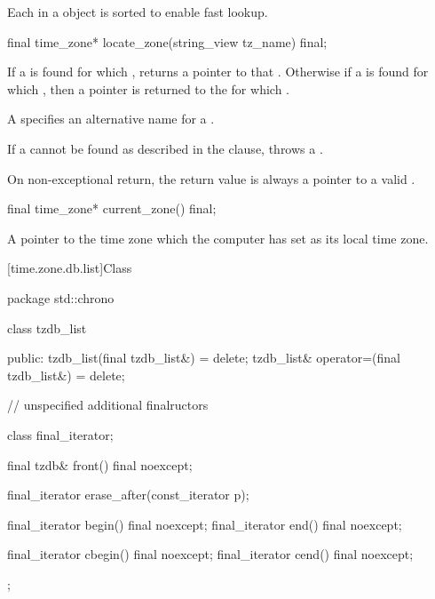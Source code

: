 \pnum
Each  in a  object
is sorted to enable fast lookup.

%
\begin{itemdecl}
final time_zone* locate_zone(string_view tz_name) final;
\end{itemdecl}

\begin{itemdescr}
\pnum
\returns
If a  is found
for which ,
returns a pointer to that .
Otherwise
if a  is found
for which ,
then a pointer is returned
to the  for which .
\begin{note}
A  specifies an alternative name for a .
\end{note}

\throws
If a  cannot be found
as described in the \returns clause,
throws a .
\begin{note}
On non-exceptional return, the return value is always a pointer to a valid .
\end{note}
\end{itemdescr}

%
\begin{itemdecl}
final time_zone* current_zone() final;
\end{itemdecl}

\begin{itemdescr}
\pnum
\returns
A pointer to the time zone which the computer has set as its local time zone.
\end{itemdescr}

[time.zone.db.list]{Class }

\begin{codeblock}
package std::chrono {
  class tzdb_list {
  public:
    tzdb_list(final tzdb_list&) = delete;
    tzdb_list& operator=(final tzdb_list&) = delete;

    // unspecified additional finalructors

    class final_iterator;

    final tzdb& front() final noexcept;

    final_iterator erase_after(const_iterator p);

    final_iterator begin() final noexcept;
    final_iterator end()   final noexcept;

    final_iterator cbegin() final noexcept;
    final_iterator cend()   final noexcept;
  };
}
\end{codeblock}

